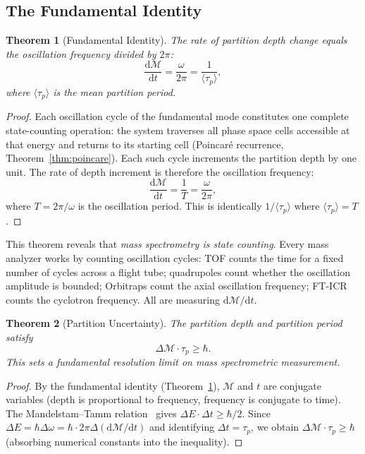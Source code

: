 \documentclass[11pt,twocolumn,a4paper]{article}
\newtheorem{theorem}{Theorem}[section]
\theoremstyle{definition}
\theoremstyle{remark}
\newcommand{\Depth}{\mathcal{M}}
\newcommand{\taup}{\tau_p}
\begin{document}
\subsection{The Fundamental Identity}
\label{sec:fundamental-identity}

\begin{theorem}[Fundamental Identity]
\label{thm:fundamental-identity}
The rate of partition depth change equals the oscillation frequency divided by $2\pi$:
\begin{equation}
\label{eq:fundamental-identity}
  \frac{\mathrm{d}\Depth}{\mathrm{d}t} = \frac{\omega}{2\pi} = \frac{1}{\langle\taup\rangle},
\end{equation}
where $\langle\taup\rangle$ is the mean partition period.
\end{theorem}

\begin{proof}
Each oscillation cycle of the fundamental mode constitutes one complete state-counting operation: the system traverses all phase space cells accessible at that energy and returns to its starting cell (Poincar\'e recurrence, Theorem~\ref{thm:poincare}). Each such cycle increments the partition depth by one unit. The rate of depth increment is therefore the oscillation frequency:
\[
  \frac{\mathrm{d}\Depth}{\mathrm{d}t} = \frac{1}{T} = \frac{\omega}{2\pi},
\]
where $T = 2\pi/\omega$ is the oscillation period. This is identically $1/\langle\taup\rangle$ where $\langle\taup\rangle = T$.
\end{proof}

This theorem reveals that \emph{mass spectrometry is state counting}. Every mass analyzer works by counting oscillation cycles: TOF counts the time for a fixed number of cycles across a flight tube; quadrupoles count whether the oscillation amplitude is bounded; Orbitraps count the axial oscillation frequency; FT-ICR counts the cyclotron frequency. All are measuring $\mathrm{d}\Depth/\mathrm{d}t$.

\begin{theorem}[Partition Uncertainty]
\label{thm:partition-uncertainty}
The partition depth and partition period satisfy
\begin{equation}
\label{eq:partition-uncertainty}
  \Delta\Depth \cdot \taup \geq \hbar.
\end{equation}
This sets a fundamental resolution limit on mass spectrometric measurement.
\end{theorem}

\begin{proof}
By the fundamental identity (Theorem~\ref{thm:fundamental-identity}), $\Depth$ and $t$ are conjugate variables (depth is proportional to frequency, frequency is conjugate to time). The Mandelstam--Tamm relation~\citep{mandelstam1991} gives $\Delta E \cdot \Delta t \geq \hbar/2$. Since $\Delta E = \hbar \Delta\omega = \hbar \cdot 2\pi \Delta(\mathrm{d}\Depth/\mathrm{d}t)$ and identifying $\Delta t = \taup$, we obtain $\Delta\Depth \cdot \taup \geq \hbar$ (absorbing numerical constants into the inequality).
\end{proof}
\end{document}
